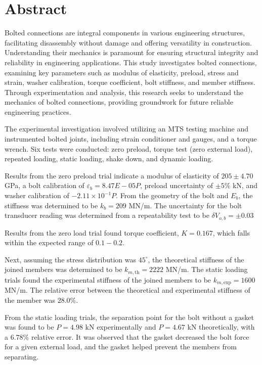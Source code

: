 \section*{Abstract}
    Bolted connections are integral components in various engineering structures, facilitating disassembly without damage and offering versatility in construction. Understanding their mechanics is paramount for ensuring structural integrity and reliability in engineering applications. This study investigates bolted connections, examining key parameters such as modulus of elasticity, preload, stress and strain, washer calibration, torque coefficient, bolt stiffness, and member stiffness. Through experimentation and analysis, this research seeks to understand the mechanics of bolted connections, providing groundwork for future reliable engineering practices.

    The experimental investigation involved utilizing an MTS testing machine and instrumented bolted joints, including strain conditioner and gauges, and a torque wrench. Six tests were conducted: zero preload, torque test (zero external load), repeated loading, static loading, shake down, and dynamic loading. 

    Results from the zero preload trial indicate a modulus of elasticity of $205 \pm 4.70$ GPa, a bolt calibration of $\varepsilon_{b} = 8.47E-05 P$, preload uncertainty of $\pm 5\%$ kN, and washer calibration of $-2.11 \times 10^{-1}P$. From the geometry of the bolt and $E_b$, the stiffness was determined to be $k_b = 209$ MN/m. The uncertainty for the bolt transducer reading was determined from a repeatability test to be $\delta V_{o, b} =\pm 0.03$
    
    Results from the zero load trial found torque coefficient, $K = 0.167$, which falls within the expected range of $0.1 - 0.2$. 
    
    Next, assuming the stress distribution was $45^{\circ}$, the theoretical stiffness of the joined members was determined to be $k_{m, \text{th}} = 2222$ MN/m. The static loading trials found the experimental stiffness of the joined members to be $k_{m, \text{exp}} = 1600$ MN/m. The relative error between the theoretical and experimental  stiffness of the member was $28.0\%$. 

    From the static loading trials, the separation point for the bolt without a gasket was found to be $P = 4.98$ kN experimentally and $P = 4.67$ kN theoretically, with a $6.78\%$ relative error. It was observed that the gasket decreased the bolt force for a given external load, and the gasket helped prevent the members from separating.

